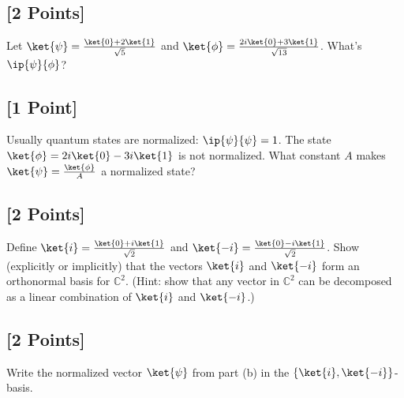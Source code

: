 \documentclass[11pt]{article}
\begin{document}
\subsection{[2 Points]} Let $\ket{\psi} = \frac{\ket{0} + 2 \ket{1}}{\sqrt{5}}$ and $\ket{\phi} = \frac{2i\ket{0} + 3\ket{1}}{\sqrt{13}}$. What's $\ip{\psi}{\phi}$?


\subsection{[1 Point]} Usually quantum states are normalized: $\ip{\psi}{\psi} = 1$. The state $\ket{\phi} = 2i \ket{0} - 3i \ket{1}$ is not normalized. What constant $A$ makes $\ket{\psi} = \frac{\ket{\phi}}{A}$ a normalized state?


\subsection{[2 Points]} Define $\ket{i} = \frac{\ket{0} + i \ket{1}}{\sqrt{2}}$ and $\ket{-i} = \frac{\ket{0} - i\ket{1}}{\sqrt{2}}$. Show (explicitly or implicitly) that the vectors $\ket{i}$ and $\ket{-i}$ form an orthonormal basis for $\mathbb{C}^2$.
(Hint: show that any vector in $\mathbb{C}^2$ can be decomposed as a linear combination of $\ket{i}$ and $\ket{-i}$.)


\subsection{[2 Points]} Write the normalized vector $\ket{\psi}$ from part (b) in the $\{\ket{i}, \ket{-i}\}$-basis.
\end{document}
